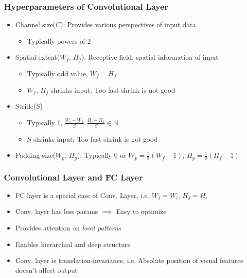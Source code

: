 \subsubsection*{Hyperparameters of Convolutional Layer}
\begin{itemize}
    \item Channel size($C$): Provides various perspectives of input data
    \begin{itemize}
        \item Typically powers of 2
    \end{itemize}
    \item Spatial extent($W_f$, $H_f$): Receptive field, spatial information of input
    \begin{itemize}
        \item Typically odd value, $W_f=H_f$
        \item $W_f$, $H_f$ shrinks input; Too fast shrink is not good
    \end{itemize}
    \item Stride($S$)
    \begin{itemize}
        \item Typically 1, $\frac{W_i-W_f}{S},\frac{H_i-H_f}{S}\in\mathbb{N}$
        \item $S$ shrinks input; Too fast shrink is not good
    \end{itemize}
    \item Padding size($W_p$, $H_p$): Typically 0 or $W_p=\frac{1}{2}(W_f-1)$, $H_p=\frac{1}{2}(H_f-1)$
\end{itemize}

\subsubsection*{Convolutional Layer and FC Layer}
\begin{itemize}
    \item FC layer is a special case of Conv. Layer, i.e. $W_f=W_i$, $H_f=H_i$
    \item Conv. layer has less params $\implies$ Easy to optimize
    \item Provides attention on \textit{local patterns}
    \item Enables hierarchial and deep structure
    \item Conv. layer is translation-invariance, i.e. Absolute position of visual features doesn't affect output
\end{itemize}
